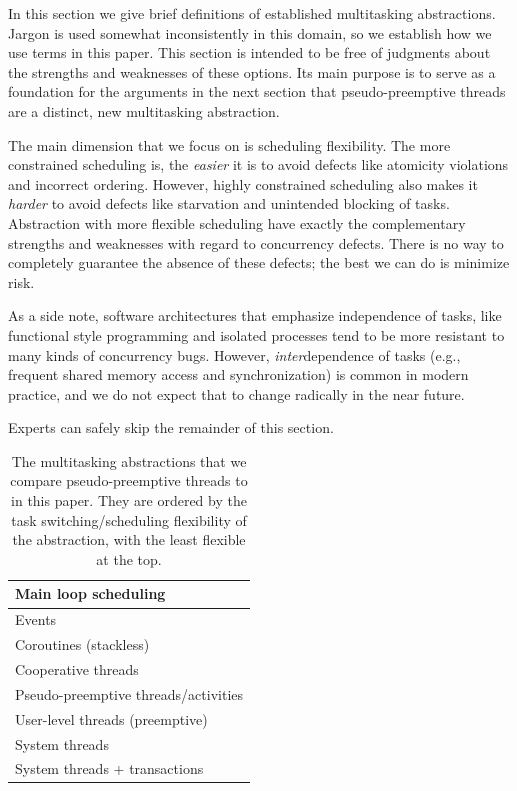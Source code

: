 \documentclass[9pt,preprint]{sigplanconf}
\begin{document}
In this section we give brief definitions of established multitasking abstractions.
Jargon is used somewhat inconsistently in this domain, so we establish how we use terms in this paper.
This section is intended to be free of judgments about the strengths and weaknesses of these options.
Its main purpose is to serve as a foundation for the arguments in the next section that pseudo-preemptive threads are a distinct, new multitasking abstraction.

The main dimension that we focus on is scheduling flexibility.
The more constrained scheduling is, the \emph{easier} it is to avoid defects like atomicity violations and incorrect ordering.
However, highly constrained scheduling also makes it \emph{harder} to avoid defects like starvation and unintended blocking of tasks.
Abstraction with more flexible scheduling have exactly the complementary strengths and weaknesses with regard to concurrency defects.
There is no way to completely guarantee the absence of these defects; the best we can do is minimize risk.

As a side note, software architectures that emphasize independence of tasks, like functional style programming and isolated processes tend to be more resistant to many kinds of concurrency bugs.
However, \emph{inter}dependence of tasks (e.g., frequent shared memory access and synchronization) is common in modern practice, and we do not expect that to change radically in the near future.

Experts can safely skip the remainder of this section.

\begin{table}
  \centering
  \begin{tabular}{|l|}
    \hline
    Main loop scheduling \\
    \hline
    Events \\
    \hline
    Coroutines (stackless) \\
    \hline
    Cooperative threads \\
    \hline
    Pseudo-preemptive threads/activities \\
    \hline
    User-level threads (preemptive) \\
    \hline
    System threads \\
    \hline
    System threads + transactions \\
    \hline
  \end{tabular}
  \caption{The multitasking abstractions that we compare pseudo-preemptive threads to in this paper.
  They are ordered by the task switching/scheduling flexibility of the abstraction, with the least flexible at the top.}
  \label{table:abstractions}
\end{table}
\end{document}
